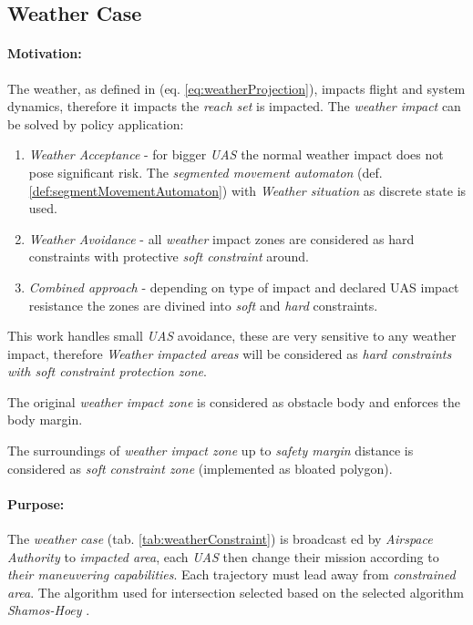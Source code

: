 \subsection{Weather Case}\label{sec:weatherCase}
\paragraph{Motivation:}  The weather, as defined in (eq. \ref{eq:weatherProjection}), impacts flight and system dynamics, therefore it impacts the \emph{reach set} is impacted. The \emph{weather impact} can be solved by policy application:

\begin{enumerate}
    \item \emph{Weather Acceptance} - for bigger \emph{UAS} the normal weather impact does not pose significant risk.  The \emph{segmented movement automaton} (def. \ref{def:segmentMovementAutomaton}) with \emph{Weather situation} as discrete state is used.
    
    \item \emph{Weather Avoidance} - all \emph{weather} impact zones are considered as hard constraints with protective \emph{soft constraint} around.
    
    \item \emph{Combined approach} - depending on type of impact and declared UAS impact resistance the zones are divined into \emph{soft} and \emph{hard} constraints.
\end{enumerate}

\begin{note}
    This work handles small \emph{UAS} avoidance, these are very sensitive to any weather impact, therefore \emph{Weather impacted areas} will be considered as \emph{hard constraints with soft constraint protection zone}. 
    
    The original \emph{weather impact zone} is considered as obstacle body and enforces the body margin.
    
    The surroundings of \emph{weather impact zone} up to \emph{safety margin} distance is considered as \emph{soft constraint zone} (implemented as bloated polygon).
\end{note}

\paragraph{Purpose:} The \emph{weather case} (tab. \ref{tab:weatherConstraint}) is broadcast ed by \emph{Airspace Authority} to \emph{impacted area}, each \emph{UAS} then change their mission according to \emph{their maneuvering capabilities}.  Each trajectory must lead away from \emph{constrained area}. The algorithm used for intersection selected based on \citep{bentley1979algorithms} the selected algorithm  \emph{Shamos-Hoey} \cite{shamos1976geometric}.

